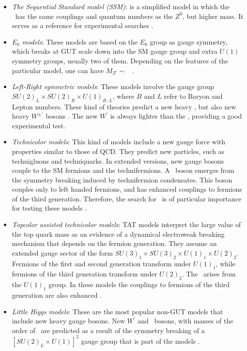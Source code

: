 \begin{itemize}
 \item \textit{The Sequential Standard model (SSM)}: is a simplified model in which the \Zprime~has the same 
couplings and quantum numbers as the $Z^{0}$, but higher mass. It serves as a 
reference for experimental searches \cite{bib:SSM}.

 \item \textit{$E_{6}$ models}: These models are based on the $E_{6}$ group as gauge symmetry,
which breaks at GUT scale down into the SM gauge group and extra $U(1)$ symmetry 
groups, usually two of them. Depending on the features of the 
particular model, one can have $M_{Z\prime} \sim$ \TeV~\cite{E6models}.

 \item \textit{Left-Right symmetric models}: These models involve the gauge group $SU(2)_{L}\times SU(2)_{R} \times U(1)_{B\cdot L}$,
where $B$ and $L$ refer to Baryon and Lepton numbers. These kind of theories 
predict a new heavy \Zprime, but also new heavy $W^{\pm \prime}$ bosons \cite{leftrightmodels}. The new 
$W^{\prime}$ is always lighter than the \Zprime, providing a good experimental test.

 \item \textit{Technicolor models}: This kind of models include a new gauge force with properties 
similar to those of QCD. They predict new particles, such as technigluons and 
techniquarks. In extended versions, new gauge bosons couple to the 
SM fermions and the technifermions. A \Zprime~boson emerges from the symmetry 
breaking induced by technifermion condensates. This boson couples only to 
left handed fermions, and has enhanced couplings to fermions of the 
third generation. Therefore, the search for \Zprimetotautau~is
of particular importance for testing these models \cite{Technicolor}.

 \item \textit{Topcolor assisted technicolor models}: TAT models interpret the large 
value of the top quark mass as an evidence 
of a dynamical electroweak breaking mechanism that depends on the fermion 
generation. They assume an extended gauge sector of the form 
$SU(3)_{1}\times SU(3)_{2} \times U(1)_{1}\times U(2)_{2}$. Fermions of
the first and second generation transform under $U(1)_{1}$, while 
fermions of the third generation transform under $U(2)_{2}$. The \Zprime~arises 
from the $U(1)_{1}$ group. In these models the couplings to fermions
of the third generation are also enhanced \cite{ZprimeThirdGeneration,TAT}.

 \item \textit{Little Higgs models}: These are the most popular non-GUT models that include 
new heavy gauge bosons. New $W^{\prime}$ and \Zprime~bosons, with masses of 
the order of \TeV~are predicted as a result of the symmetry 
breaking of a $[SU(2)_{L}\times U(1)]^{2}$ gauge group that is part of the models \cite{LittleHiggs1,LittleHiggs2}.

\end{itemize}







